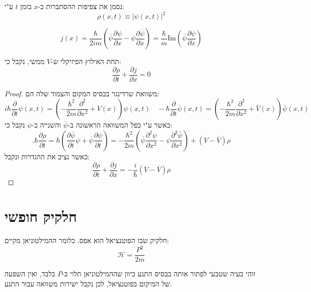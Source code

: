 \documentclass{tstextbook}
\begin{document}
\begin{definition}
נסמן את צפיפות ההסתברות ב-\(x\) בזמן \(t\) ע"י:
$$\rho\left(x,t\right)\equiv\left|\psi\left(x,t\right)\right|^{2}$$

\end{definition}
\begin{definition}
$$j\left(x\right)=\frac\hbar{2i m}\left(\overline{{{\psi}}}\frac{\partial\psi}{\partial x}-\psi\frac{\partial\overline{{{\psi}}}}{\partial x}\right)=\frac\hbar m\mathrm{Im}\left(\overline{{{\psi}}}\frac{\partial\psi}{\partial x}\right)$$

\end{definition}
\begin{proposition}
תחת האילוץ הפיזיקלי ש-\(V\) ממשי, נקבל כי:
$${\frac{\partial\rho}{\partial t}}+{\frac{\partial j}{\partial x}}=0$$

\end{proposition}
\begin{proof}
משוואת שרדינגר בבסיס המקום והצמוד שלה הם:
$$i\hbar\frac{\partial}{\partial t}\psi\left(x,t\right)=\left(-\frac{\hbar^{2}}{2m}\frac{\partial^{2}}{\partial x^{2}}+V\left(x\right)\right)\psi\left(x,t\right)\quad -\left.\hbar{\frac{\partial}{\partial t}}{\overline{{\psi}}}\left(x,t\right)=\left(-{\frac{\hbar^{2}}{2m}}{\frac{\partial^{2}}{\partial x^{2}}}+{\overline{{V}}}\left(x\right)\right){\overline{{\psi}}}\left(x,t\right)\right.$$
כאשר ע"י כפל המשוואה הראשונה ב-\(\overline{\psi}\) והשנייה ב-\(\psi\) נקבל כי:
$$.\hbar{\frac{\partial\rho}{\partial t}}=\hbar\left({\frac{\partial{\overline{{\psi}}}}{\partial t}}\psi+{\overline{{\psi}}}{\frac{\partial\psi}{\partial t}}\right)=-{\frac{\hbar^{2}}{2m}}\left({\overline{{\psi}}}{\frac{\partial^{2}\psi}{\partial x^{2}}}-\psi{\frac{\partial^{2}{\overline{{\psi}}}}{\partial x^{2}}}\right)+\left(V-{\overline{{V}}}\right)\rho$$
כאשר נציב את ההגדרות ונקבל:
$${\frac{\partial\rho}{\partial t}}+{\frac{\partial j}{\partial x}}=-{\frac{i}{\hbar}}\left(V-{\overline{{V}}}\right)\rho$$

\end{proof}
\section{חלקיק חופשי}

\begin{definition}
חלקיק שבו הפוטנציאל הוא אפס. כלומר ההמילטוניאן מקיים:
$$\mathcal{H}= \frac{P^{2}}{2m}$$

\end{definition}
זוהי בעיה שטבעי לפתור אותה בבסיס התנע כיוון שההמילטוניאן תלוי ב-\(P\) בלבד, ואין השפעה של המיקום בפוטנציאל, לכן נקבל ישירות משוואה עבור התנע.
\end{document}
